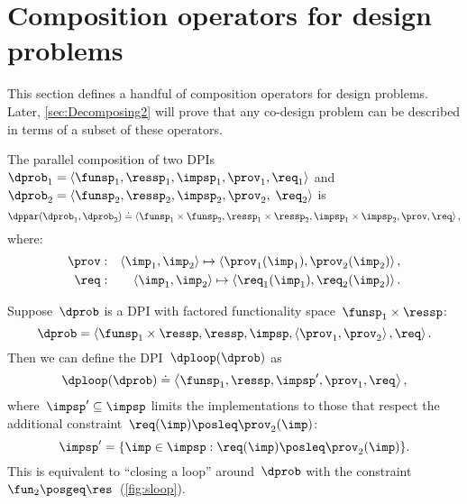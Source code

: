 

\section{Composition operators for design problems}

This section defines a handful of composition operators for design
problems. Later, \cref{sec:Decomposing2} will prove that any co-design
problem can be described in terms of a subset of these operators.

\label{sec:threeoperators}

\begin{definition}[$\dppar$]
  \label{def:parallel}
  The parallel composition of two DPIs $\dprob_{1}=\left\langle \funsp_{1},\ressp_{1},\impsp_{1},\prov_{1},\req_{1}\right\rangle $
  and $\dprob_{2}=\langle\funsp_{2},\ressp_{2},\impsp_{2},\prov_{2},$
  $\req_{2}\rangle$ is
  \[
    \dppar(\dprob_{1},\dprob_{2})\doteq\left\langle \funsp_{1}\times\funsp_{2},\ressp_{1}\times\ressp_{2},\impsp_{1}\times\impsp_{2},\prov,\req\right\rangle ,
  \]
  where:
  \begin{eqnarray}
    \prov & : & \left\langle \imp_{1},\imp_{2}\right\rangle \mapsto\left\langle \prov_{1}(\imp_{1}),\prov_{2}(\imp_{2})\right\rangle ,\label{eq:dppar-exec}\\
    \req & : & \left\langle \imp_{1},\imp_{2}\right\rangle \mapsto\left\langle \req_{1}(\imp_{1}),\req_{2}(\imp_{2})\right\rangle .\nonumber
  \end{eqnarray}

\end{definition}


\begin{definition}[$\dploop$]
  \label{def:dp_loop}Suppose~$\dprob$ is a DPI with factored functionality
  space~$\funsp_{1}\times\ressp$:
  \[
    \dprob=\left\langle \funsp_{1}\times\ressp,\ressp,\impsp,\left\langle \prov_{1},\prov_{2}\right\rangle ,\req\right\rangle.
  \]
  Then we can define the DPI~$\dploop(\dprob)$ as
  \[
    \dploop(\dprob)\doteq\left\langle \funsp_{1},\ressp,\impsp',\prov_{1},\req\right\rangle ,
  \]
  where~$\impsp'\subseteq\impsp$ limits the implementations to those
  that respect the additional constraint~$\req(\imp)\posleq\prov_{2}(\imp)$:
  \[
    \impsp'=\{\imp\in\impsp:\req(\imp)\posleq\prov_{2}(\imp)\}.
  \]
  This is equivalent to ``closing a loop'' around~$\dprob$ with
  the constraint~$\fun_{2}\posgeq\res$~(\cref{fig:sloop}).
\end{definition}

